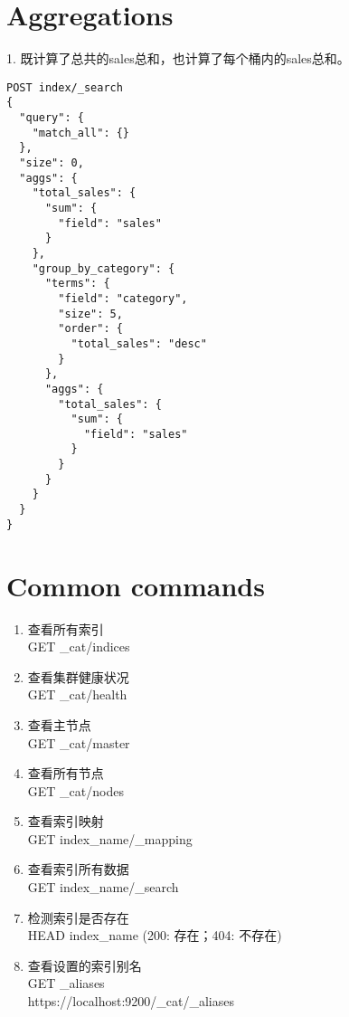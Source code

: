 \documentclass[]{exam}
\begin{document}
\begin{questions}
\section{Aggregations}
1. 既计算了总共的sales总和，也计算了每个桶内的sales总和。
\begin{verbatim}
POST index/_search
{
  "query": {
    "match_all": {}
  },
  "size": 0,
  "aggs": {
    "total_sales": {
      "sum": {
        "field": "sales"
      }
    },
    "group_by_category": {
      "terms": {
        "field": "category",
        "size": 5,
        "order": {
          "total_sales": "desc"
        }
      },
      "aggs": {
        "total_sales": {
          "sum": {
            "field": "sales"
          }
        }
      }
    }
  }
}
\end{verbatim}

\section{Common commands}
\begin{enumerate}
    \item 查看所有索引 \\
    GET \_cat/indices
    \item 查看集群健康状况 \\
    GET \_cat/health
    \item 查看主节点 \\ 
    GET \_cat/master
    \item 查看所有节点 \\ 
    GET \_cat/nodes
    \item 查看索引映射 \\
    GET index\_name/\_mapping
    \item 查看索引所有数据 \\
    GET index\_name/\_search
    \item 检测索引是否存在 \\
    HEAD index\_name (200: 存在；404: 不存在)
    \item 查看设置的索引别名 \\
    GET \_aliases \\
    {https://localhost:9200/\_cat/\_aliases}
\end{enumerate}













\end{questions}
\end{document}
